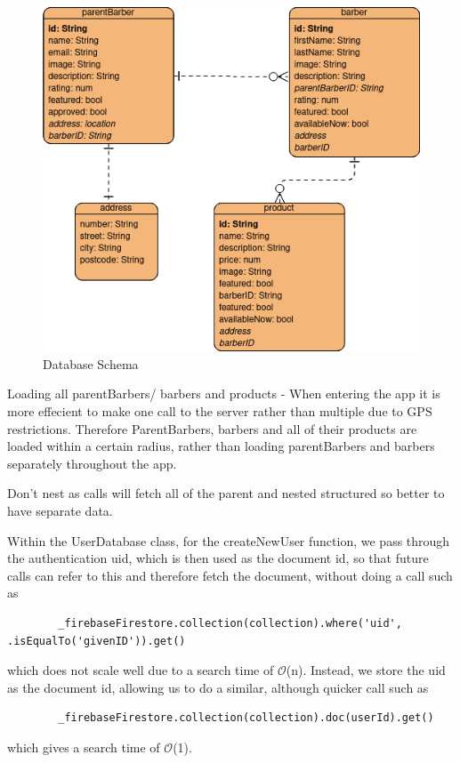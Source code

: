 \documentclass[12pt]{article}
\begin{document}
	\begin{figure}[H]
		\centering
		\includegraphics[scale=0.7]{images/database-schema.png}
		\caption{Database Schema}
		\label{fig:database-schema}
	\end{figure}
	
	Loading all parentBarbers/ barbers and products - 
	When entering the app it is more effecient to make one call to the server rather than multiple due to GPS restrictions. Therefore ParentBarbers, barbers and all of their products are loaded within a certain radius, rather than loading parentBarbers and barbers separately throughout the app. 
	
	Don't nest as calls will fetch all of the parent and nested structured so better to have separate data.
	
	
	Within the UserDatabase class, for the createNewUser function, we pass through the authentication uid, which is then used as the document id, so that future calls can refer to this and therefore fetch the document, without doing a call such as 
	\begin{lstlisting}
		_firebaseFirestore.collection(collection).where('uid', .isEqualTo('givenID')).get()
	\end{lstlisting}
	which does not scale well due to a search time of $\mathcal{O}$(n). Instead, we store the uid as the document id, allowing us to do a similar, although quicker call such as
	\begin{lstlisting}
		_firebaseFirestore.collection(collection).doc(userId).get()
	\end{lstlisting}
	which gives a search time of $\mathcal{O}$(1).
	
\end{document}

